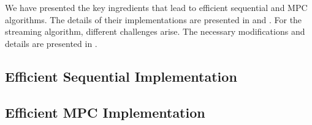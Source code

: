 
We have presented the key ingredients that lead to efficient sequential and MPC algorithms. The details of their implementations are presented in  and . For the streaming algorithm, different challenges arise. The necessary modifications and details are presented in . 

\subsection{Efficient Sequential Implementation}\label{sec:efficientsequential}


\subsection{Efficient MPC Implementation}\label{sec:efficientmpc}
